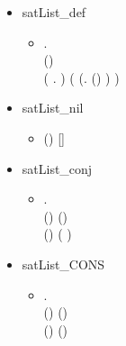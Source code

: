 \begin{itemize}
\item satList_def
  \begin{itemize}
    \item[] \HOLTokenTurnstile{} \HOLSymConst{\HOLTokenForall{}}   .\\
     (\HOLSymConst{,}\HOLSymConst{,})   \HOLSymConst{\HOLTokenEquiv{}}\\
      (\HOLTokenLambda{} .  \HOLSymConst{\HOLTokenConj{}} )  ( (\HOLTokenLambda{}. (\HOLSymConst{,}\HOLSymConst{,})  ) )
   \end{itemize}
   \item satList_nil
  \begin{itemize}
    \item[] \HOLTokenTurnstile{} (\HOLSymConst{,}\HOLSymConst{,})  []
    \end{itemize}
    \item satList_conj
  \begin{itemize}
    \item[] \HOLTokenTurnstile{} \HOLSymConst{\HOLTokenForall{}}    .\\
     (\HOLSymConst{,}\HOLSymConst{,})   \HOLSymConst{\HOLTokenConj{}} (\HOLSymConst{,}\HOLSymConst{,})   \HOLSymConst{\HOLTokenEquiv{}}\\
     (\HOLSymConst{,}\HOLSymConst{,})  ( \HOLSymConst{++} )
   \end{itemize}
   \item satList_CONS
  \begin{itemize}
    \item[] \HOLTokenTurnstile{} \HOLSymConst{\HOLTokenForall{}}    .\\
     (\HOLSymConst{,}\HOLSymConst{,})  (\HOLSymConst{::}) \HOLSymConst{\HOLTokenEquiv{}}\\ (\HOLSymConst{,}\HOLSymConst{,})   \HOLSymConst{\HOLTokenConj{}} (\HOLSymConst{,}\HOLSymConst{,})  
    \end{itemize}
  \end{itemize}

